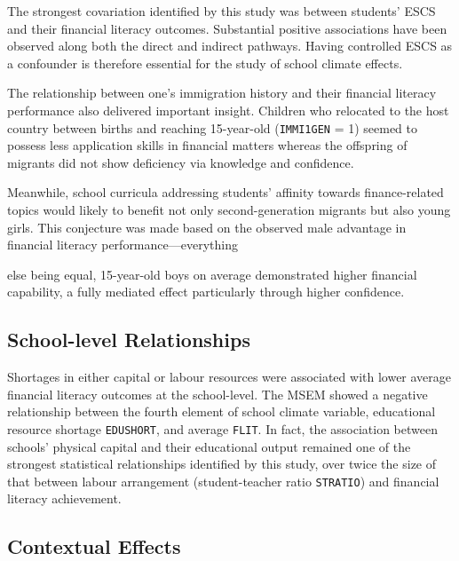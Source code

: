 \documentclass[a4paper,11pt,UKenglish,twoside,openright]{report}\usepackage[]{graphicx}\usepackage[]{color}
\begin{document}
The strongest covariation identified by this study was between students' ESCS and their financial literacy outcomes. Substantial positive associations have been observed along both the direct and indirect pathways. Having controlled ESCS as a confounder is therefore essential for the study of school climate effects.

The relationship between one's immigration history and their financial literacy performance also delivered important insight. Children who relocated to the host country between births and reaching 15-year-old (\texttt{IMMI1GEN} = 1) seemed to possess less application skills in financial matters whereas the offspring of migrants did not show deficiency via knowledge and confidence.

Meanwhile, school curricula addressing students' affinity towards finance-related topics would likely to benefit not only second-generation migrants but also young girls. This conjecture was made based on the observed male advantage in financial literacy performance---everything





\noindent else being equal, 15-year-old boys on average demonstrated higher financial capability, a fully mediated effect particularly through higher confidence.



\subsection{School-level Relationships}

Shortages in either capital or labour resources were associated with lower average financial literacy outcomes at the school-level. The MSEM showed a negative relationship between the fourth element of school climate variable, educational resource shortage \texttt{EDUSHORT}, and average \texttt{FLIT}. In fact, the association between schools' physical capital and their educational output remained one of the strongest statistical relationships identified by this study, over twice the size of that between labour arrangement (student-teacher ratio \texttt{STRATIO}) and financial literacy achievement.

\subsection{Contextual Effects}
\end{document}
